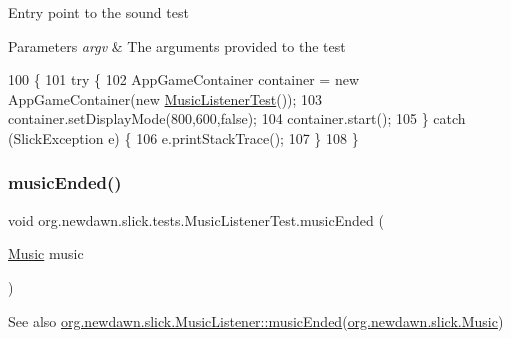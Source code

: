 Entry point to the sound test


\begin{DoxyParams}{Parameters}
{\em argv} & The arguments provided to the test \\
\hline
\end{DoxyParams}

\begin{DoxyCode}
100                                            \{
101         \textcolor{keywordflow}{try} \{
102             AppGameContainer container = \textcolor{keyword}{new} AppGameContainer(\textcolor{keyword}{new} 
      \mbox{\hyperlink{classorg_1_1newdawn_1_1slick_1_1tests_1_1_music_listener_test_a7417ff7ac4e26a349ed7483f97f46641}{MusicListenerTest}}());
103             container.setDisplayMode(800,600,\textcolor{keyword}{false});
104             container.start();
105         \} \textcolor{keywordflow}{catch} (SlickException e) \{
106             e.printStackTrace();
107         \}
108     \}
\end{DoxyCode}
\mbox{\label{classorg_1_1newdawn_1_1slick_1_1tests_1_1_music_listener_test_aba42fdf23841e22f89ef620b1b30fed1}} 
\subsubsection{\texorpdfstring{music\+Ended()}{musicEnded()}}
{\footnotesize\ttfamily void org.\+newdawn.\+slick.\+tests.\+Music\+Listener\+Test.\+music\+Ended (\begin{DoxyParamCaption}\item[{\mbox{\hyperlink{classorg_1_1newdawn_1_1slick_1_1_music}{Music}}}]{music }\end{DoxyParamCaption})\hspace{0.3cm}{\ttfamily [inline]}}

\begin{DoxySeeAlso}{See also}
\mbox{\hyperlink{interfaceorg_1_1newdawn_1_1slick_1_1_music_listener_af0d830c22b57e9d811d91e0e430b122e}{org.\+newdawn.\+slick.\+Music\+Listener\+::music\+Ended}}(\mbox{\hyperlink{classorg_1_1newdawn_1_1slick_1_1_music}{org.\+newdawn.\+slick.\+Music}}) 
\end{DoxySeeAlso}


